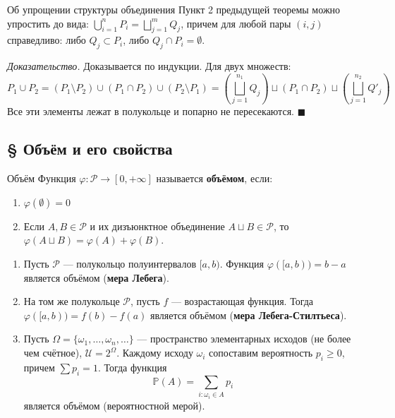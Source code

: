 \documentclass[12pt,a4paper]{article}
\newenvironment{Proof}[1][Доказательство]{\vspace{0.5em}\noindent\textit{#1.}\hspace{0.5em}\ignorespaces}{\hfill$\blacksquare$\vspace{1em}}
\begin{document}
\begin{Lemma}{Об упрощении структуры объединения}{}
Пункт 2 предыдущей теоремы можно упростить до вида: $\bigcup\limits_{i=1}^n P_i = \bigsqcup\limits_{j=1}^m Q_j$, причем для любой пары $(i, j)$ справедливо: либо $Q_j \subset P_i$, либо $Q_j \cap P_i = \emptyset$.
\end{Lemma}

\begin{Proof}
Доказывается по индукции. Для двух множеств:
$$ P_1 \cup P_2 = (P_1 \setminus P_2) \cup (P_1 \cap P_2) \cup (P_2 \setminus P_1) = \left( \bigsqcup\limits_{j=1}^{n_1} Q_j \right) \sqcup (P_1 \cap P_2) \sqcup \left( \bigsqcup\limits_{j=1}^{n_2} Q'_j \right) $$
Все эти элементы лежат в полукольце и попарно не пересекаются.
\end{Proof}

\subsection{§ Объём и его свойства}

\begin{Definition}{Объём}{}
Функция $\varphi : \mathcal{P} \to [0, +\infty]$ называется \textbf{объёмом}, если:
\begin{enumerate}
    \item $\varphi(\emptyset) = 0$
    \item Если $A, B \in \mathcal{P}$ и их дизъюнктное объединение $A \sqcup B \in \mathcal{P}$, то $\varphi(A \sqcup B) = \varphi(A) + \varphi(B)$.
\end{enumerate}
\end{Definition}

\begin{Example}
\begin{enumerate}
    \item Пусть $\mathcal{P}$ — полукольцо полуинтервалов $[a, b)$. Функция $\varphi([a, b)) = b - a$ является объёмом (\textbf{мера Лебега}).
    \item На том же полукольце $\mathcal{P}$, пусть $f$ — возрастающая функция. Тогда $\varphi([a, b)) = f(b) - f(a)$ является объёмом (\textbf{мера Лебега-Стилтьеса}).
    \item Пусть $\Omega = \{\omega_1, \dots, \omega_n, \dots\}$ — пространство элементарных исходов (не более чем счётное), $\mathcal{U} = 2^\Omega$. Каждому исходу $\omega_i$ сопоставим вероятность $p_i \ge 0$, причем $\sum p_i = 1$. Тогда функция
    $$ \mathbb{P}(A) = \sum_{i: \omega_i \in A} p_i $$
    является объёмом (вероятностной мерой).
\end{enumerate}
\end{Example}
\end{document}
